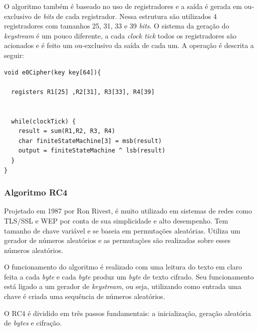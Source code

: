 O algoritmo também é baseado no uso de registradores e a saída é gerada em ou-exclusivo de \textit{bits} de cada registrador. Nessa estrutura são utilizados 4 registradores com tamanhos 25, 31, 33 e 39 \textit{bits}. O sistema da geração do \textit{keystream} é um pouco diferente, a cada \textit{clock tick} todos os registradores são acionados e é feito um ou-exclusivo da saída de cada um. A operação é descrita a seguir:

\begin{lstlisting}[caption={Pseudo-código E0}, label=e0-pseudo-code]
void e0Cipher(key key[64]){

  registers R1[25] ,R2[31], R3[33], R4[39]


  while(clockTick) {
  	result = sum(R1,R2, R3, R4)
  	char finiteStateMachine[3] = msb(result)
  	output = finiteStateMachine ^ lsb(result)
  }
}
    \end{lstlisting}

\subsubsection{Algoritmo RC4}
\label{algorithm-rc4}

Projetado em 1987 por Ron Rivest, é muito utilizado em sistemas de redes como TLS/SSL e WEP por conta de sua simplicidade e alto desempenho. Tem tamanho de chave variável e se baseia em permutações aleatórias. Utiliza um gerador de números aleatórios e as permutações são realizadas sobre esses números aleatórios.

O funcionamento do algoritmo é realizado com uma leitura do texto em claro feita a cada \textit{byte} e cada \textit{byte} produz um \textit{byte} de texto cifrado. Seu funcionamento está ligado a um gerador de \textit{keystream}, ou seja, utilizando como entrada uma chave é criada uma sequência de números aleatórios.

O RC4 é dividido em três passos fundamentais: a inicialização, geração aleatória de \textit{bytes} e cifração.

